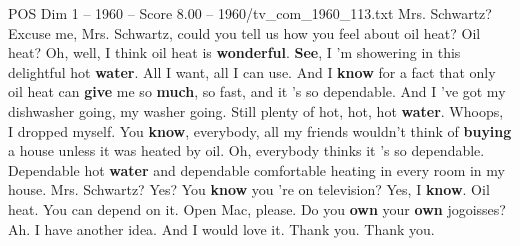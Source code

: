 \begin{textsample}{POS Dim 1 – 1960 – Score 8.00 – 1960/tv\_com\_1960\_113.txt}  \label{ex:f1_pos_025}
Mrs.
Schwartz?
Excuse me, Mrs.
Schwartz, could you tell us how you feel about oil heat?
Oil heat?
Oh, well, I think oil heat is \textbf{wonderful}. \textbf{See}, I 'm showering in this delightful hot \textbf{water}.
All I want, all I can use.
And I \textbf{know} for a fact that only oil heat can \textbf{give} me so \textbf{much}, so fast, and it 's so dependable.
And I 've got my dishwasher going, my washer going.
Still plenty of hot, hot, hot \textbf{water}.
Whoops, I dropped myself.
You \textbf{know}, everybody, all my friends wouldn't think of \textbf{buying} a house unless it was heated by oil.
Oh, everybody thinks it 's so dependable.
Dependable hot \textbf{water} and dependable comfortable heating in every room in my house.
Mrs.
Schwartz?
Yes?
You \textbf{know} you 're on television?
Yes, I \textbf{know}.
Oil heat.
You can depend on it.
Open Mac, please.
Do you \textbf{own} your \textbf{own} jogoisses?
Ah.
I have another idea.
And I would love it.
Thank you.
Thank you.

\end{textsample}

